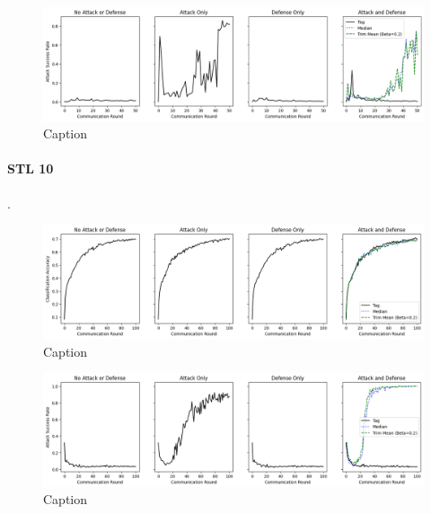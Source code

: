 \documentclass{article} %
\begin{document}
\begin{figure}[H]
    \centering
    \includegraphics[width=\textwidth]{cifar_100/classic/tag/distributed/alpha10000--alpha_val10000/visuals/pois_accuracy--n_malicious2--beta0.2.png}
    \caption{Caption}
    \label{fig:my_label}
\end{figure}


%
\paragraph{STL 10}.

\begin{figure}[H]
    \centering
    \includegraphics[width=\textwidth]{stl_10/classic/tag/distributed/alpha10000--alpha_val10000/visuals/clean_accuracy--n_malicious2--beta0.2.png}
    \caption{Caption}
    \label{fig:my_label}
\end{figure}

\begin{figure}[H]
    \centering
    \includegraphics[width=\textwidth]{stl_10/classic/tag/distributed/alpha10000--alpha_val10000/visuals/pois_accuracy--n_malicious2--beta0.2.png}
    \caption{Caption}
    \label{fig:my_label}
\end{figure}
\end{document}
